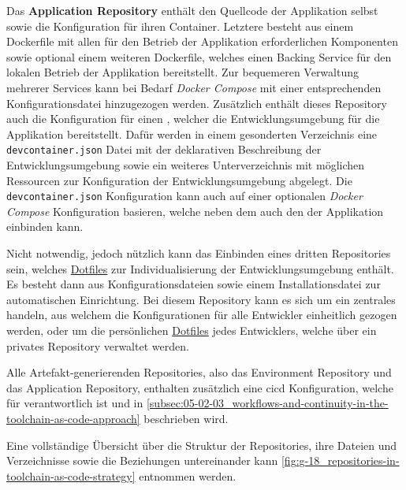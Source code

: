 Das \textbf{Application Repository} enthält den Quellcode der Applikation selbst sowie die Konfiguration für ihren Container. Letztere besteht aus einem Dockerfile mit allen für den Betrieb der Applikation erforderlichen Komponenten sowie optional einem weiteren Dockerfile, welches einen Backing Service für den lokalen Betrieb der Applikation bereitstellt. Zur bequemeren Verwaltung mehrerer Services kann bei Bedarf \textit{Docker Compose} mit einer entsprechenden Konfigurationsdatei hinzugezogen werden. Zusätzlich enthält dieses Repository auch die Konfiguration für einen , welcher die Entwicklungsumgebung für die Applikation bereitstellt. \linebreak[4]
Dafür werden in einem gesonderten Verzeichnis eine \texttt{devcontainer.json} Datei mit der deklarativen Beschreibung der Entwicklungsumgebung sowie ein weiteres Unterverzeichnis mit möglichen Ressourcen zur Konfiguration der Entwicklungsumgebung abgelegt. Die \texttt{devcontainer.json} Konfiguration kann auch auf einer optionalen \textit{Docker Compose} Konfiguration basieren, welche neben dem  auch den  der Applikation einbinden kann.

Nicht notwendig, jedoch nützlich kann das Einbinden eines dritten Repositories sein, welches \hyperref[sec:03-04_idea-of-dotfiles]{Dotfiles} zur Individualisierung der Entwicklungsumgebung enthält. Es besteht dann aus Konfigurationsdateien sowie einem Installationsdatei zur automatischen Einrichtung. Bei diesem Repository kann es sich um ein zentrales handeln, aus welchem die Konfigurationen für alle Entwickler einheitlich gezogen werden, oder um die persönlichen \hyperref[sec:03-04_idea-of-dotfiles]{Dotfiles} jedes Entwicklers, welche über ein privates Repository verwaltet werden.

Alle Artefakt-generierenden Repositories, also das Environment Repository und das Application Repository, enthalten zusätzlich eine \Gls{cicd} Konfiguration, welche für  verantwortlich ist und in \autoref{subsec:05-02-03_workflows-and-continuity-in-the-toolchain-as-code-approach} beschrieben wird.

Eine vollständige Übersicht über die Struktur der Repositories, ihre Dateien und Verzeichnisse sowie die Beziehungen untereinander kann \autoref{fig:g-18_repositories-in-toolchain-as-code-strategy} entnommen werden.

